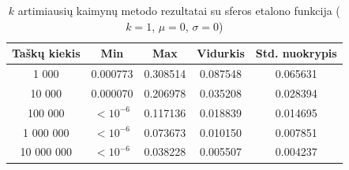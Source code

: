 \begin{table}[H]
    \centering
    \begin{tabular}{|c|c|c|c|c|}
        \hline
        \textbf{Taškų kiekis} & \textbf{Min} & \textbf{Max} & \textbf{Vidurkis} & \textbf{Std. nuokrypis} \\ \hline
        1 000        & 0.000773 & 0.308514 & 0.087548 & 0.065631 \\ \hline
        10 000       & 0.000070 & 0.206978 & 0.035208 & 0.028394 \\ \hline
        100 000      & $<10^{-6}$ & 0.117136 & 0.018839 & 0.014695 \\ \hline
        1 000 000    & $<10^{-6}$ & 0.073673 & 0.010150 & 0.007851 \\ \hline
        10 000 000   & $<10^{-6}$ & 0.038228 & 0.005507 & 0.004237 \\ \hline
    \end{tabular}
    \caption{$k$ artimiausių kaimynų metodo rezultatai su sferos etalono funkcija ($k = 1$, $\mu = 0$, $\sigma = 0$)}
\end{table}